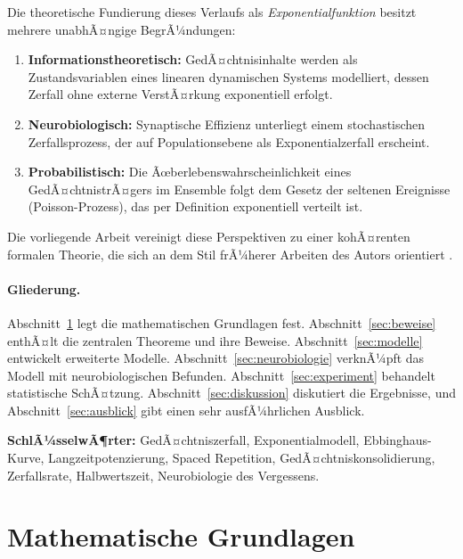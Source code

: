 ﻿\documentclass[12pt,a4paper,twoside]{article}
\theoremstyle{theormstyle}
\theoremstyle{proofstyle}
\begin{document}
	Die theoretische Fundierung dieses Verlaufs als \emph{Exponentialfunktion}
	besitzt mehrere unabhÃ¤ngige BegrÃ¼ndungen:
	\begin{enumerate}[label=(\roman*)]
		\item \textbf{Informationstheoretisch:} GedÃ¤chtnisinhalte werden als
		Zustandsvariablen eines linearen dynamischen Systems modelliert, dessen
		Zerfall ohne externe VerstÃ¤rkung exponentiell erfolgt.
		\item \textbf{Neurobiologisch:} Synaptische Effizienz unterliegt einem
		stochastischen Zerfallsprozess, der auf Populationsebene
		als Exponentialzerfall erscheint.
		\item \textbf{Probabilistisch:} Die Ãœberlebenswahrscheinlichkeit
		eines GedÃ¤chtnistrÃ¤gers im Ensemble folgt dem Gesetz der
		seltenen Ereignisse (Poisson-Prozess), das per Definition exponentiell
		verteilt ist.
	\end{enumerate}
	
	Die vorliegende Arbeit vereinigt diese Perspektiven zu einer kohÃ¤renten
	formalen Theorie, die sich an dem Stil frÃ¼herer Arbeiten des Autors
	orientiert \citep{epp2026subgraph,epp2026biofalcon,epp2026vadis}.
	
	\paragraph{Gliederung.}
	Abschnitt~\ref{sec:grundlagen} legt die mathematischen Grundlagen fest.
	Abschnitt~\ref{sec:beweise} enthÃ¤lt die zentralen Theoreme und ihre Beweise.
	Abschnitt~\ref{sec:modelle} entwickelt erweiterte Modelle.
	Abschnitt~\ref{sec:neurobiologie} verknÃ¼pft das Modell mit neurobiologischen
	Befunden. Abschnitt~\ref{sec:experiment} behandelt statistische SchÃ¤tzung.
	Abschnitt~\ref{sec:diskussion} diskutiert die Ergebnisse, und
	Abschnitt~\ref{sec:ausblick} gibt einen sehr ausfÃ¼hrlichen Ausblick.
	
	\noindent\textbf{SchlÃ¼sselwÃ¶rter:} GedÃ¤chtniszerfall, Exponentialmodell,
	Ebbinghaus-Kurve, Langzeitpotenzierung, Spaced Repetition, GedÃ¤chtniskonsolidierung,
	Zerfallsrate, Halbwertszeit, Neurobiologie des Vergessens.
	
	\section{Mathematische Grundlagen}
	\label{sec:grundlagen}
	
\end{document}
